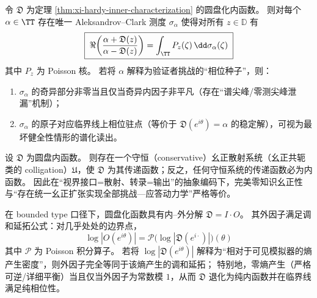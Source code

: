 \begin{corollary}\label{cor:xi-clark-measure-horizon-semantics}
令 \(\mathfrak{D}\) 为定理 \ref{thm:xi-hardy-inner-characterization} 的圆盘化内函数。
则对每个 \(\alpha\in\TT\) 存在唯一 Aleksandrov--Clark 测度 \(\sigma_\alpha\) 使得对所有 \(z\in\mathbb{D}\) 有
\[
\boxed{\;
\Re\!\left(\frac{\alpha+\mathfrak{D}(z)}{\alpha-\mathfrak{D}(z)}\right)
=\int_{\TT} P_z(\zeta)\,\dd\sigma_\alpha(\zeta)\;}
\]
其中 \(P_z\) 为 Poisson 核。
若将 \(\alpha\) 解释为验证者挑战的“相位种子”，则：
\begin{enumerate}
  \item \(\sigma_\alpha\) 的奇异部分非零当且仅当奇异内因子非平凡（存在“谱尖峰/零测尖峰泄漏”机制）；
  \item \(\sigma_\alpha\) 的原子对应临界线上相位驻点（等价于 \(\mathfrak{D}(e^{i\theta})=\alpha\) 的稳定解），可视为最坏健全性情形的谱化读出。
\end{enumerate}
\end{corollary}

\begin{theorem}\label{thm:xi-inner-iff-conservative-colligation}
设 \(\mathfrak{D}\) 为圆盘内函数。
则存在一个守恒（conservative）幺正散射系统（幺正共轭类的 colligation）\(\mathfrak{U}\)，使 \(\mathfrak{D}\) 为其传递函数；反之，任何守恒系统的传递函数必为内函数。
因此在“视界接口=散射、转录=输出”的抽象编码下，完美零知识幺正性与“存在统一幺正扩张实现全部挑战—应答动力学”严格等价。
\end{theorem}

\begin{proposition}\label{prop:xi-entropy-production-equals-outer-factor}
在 bounded type 口径下，圆盘化函数具有内–外分解 \(\mathfrak{D}=I\cdot O\)。
其外因子满足调和延拓公式：对几乎处处的边界点，
\[
\boxed{\;
\log|O(e^{i\theta})|
=\mathcal{P}\!\bigl(\log|\mathfrak{D}(e^{i\cdot})|\bigr)(\theta)\;}
\]
其中 \(\mathcal{P}\) 为 Poisson 积分算子。
若将 \(\log|\mathfrak{D}(e^{i\theta})|\) 解释为“相对于可见模拟器的熵产生密度”，则外因子完全等同于该熵产生的调和延拓；
特别地，零熵产生（严格可逆/详细平衡）当且仅当外因子为常数模 \(1\)，从而 \(\mathfrak{D}\) 退化为纯内函数并在临界线满足纯相位性。
\end{proposition}

